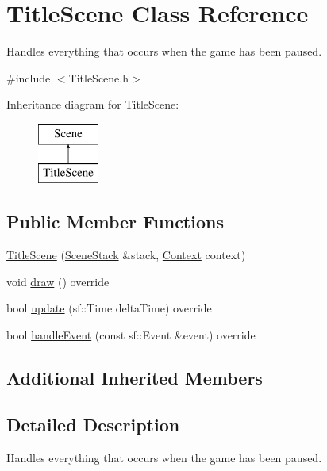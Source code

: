 \hypertarget{class_title_scene}{}\section{Title\+Scene Class Reference}
\label{class_title_scene}


Handles everything that occurs when the game has been paused.  




{\ttfamily \#include $<$Title\+Scene.\+h$>$}

Inheritance diagram for Title\+Scene\+:\begin{figure}[H]
\begin{center}
\leavevmode
\includegraphics[height=2.000000cm]{class_title_scene}
\end{center}
\end{figure}
\subsection*{Public Member Functions}
\begin{DoxyCompactItemize}
\item 
\hyperlink{class_title_scene_a280a3b1e5890f45b932860777f8fbe6d}{Title\+Scene} (\hyperlink{class_scene_stack}{Scene\+Stack} \&stack, \hyperlink{struct_scene_1_1_context}{Context} context)
\item 
void \hyperlink{class_title_scene_a3e527255771f75a41c4fe8aaa35999dd}{draw} () override
\item 
bool \hyperlink{class_title_scene_a17ce1b5b9f6f8ca44a6ed3326e9e5d0a}{update} (sf\+::\+Time delta\+Time) override
\item 
bool \hyperlink{class_title_scene_a1f019a83309ce967883b4b4d76b816af}{handle\+Event} (const sf\+::\+Event \&event) override
\end{DoxyCompactItemize}
\subsection*{Additional Inherited Members}


\subsection{Detailed Description}
Handles everything that occurs when the game has been paused. 



